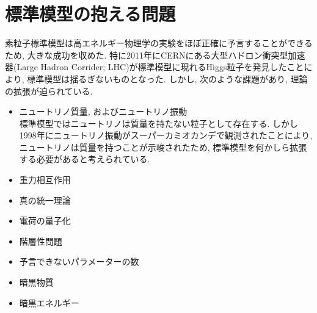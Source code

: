 %
%
\section{標準模型の抱える問題}
素粒子標準模型は高エネルギー物理学の実験をほぼ正確に予言することができるため, 大きな成功を収めた.
特に2011年にCERNにある大型ハドロン衝突型加速器(Large Hadron Corrider; LHC)が標準模型に現れるHiggs粒子を発見したことにより, 標準模型は揺るぎないものとなった.
しかし, 次のような課題があり, 理論の拡張が迫られている.
\begin{itemize}
        \item ニュートリノ質量, およびニュートリノ振動\\
              標準模型ではニュートリノは質量を持たない粒子として存在する.
              しかし1998年にニュートリノ振動がスーパーカミオカンデで観測されたことにより, ニュートリノは質量を持つことが示唆されたため, 標準模型を何かしら拡張する必要があると考えられている.
      \item 重力相互作用
      \item 真の統一理論
      \item 電荷の量子化
      \item 階層性問題
      \item 予言できないパラメーターの数
      \item 暗黒物質
      \item 暗黒エネルギー
\end{itemize}

